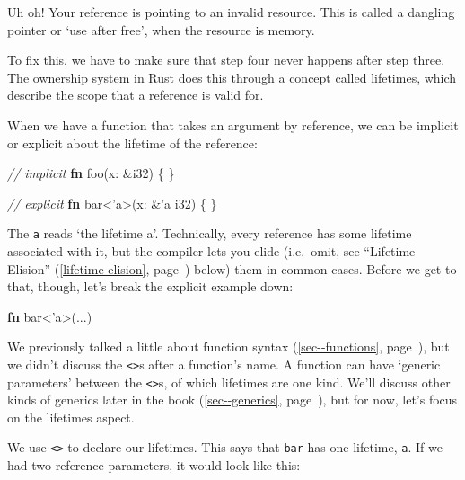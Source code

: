 \documentclass[a4paper,]{book}
\renewcommand*{\hyperlink}[2]{%
 #2 (\autoref{#1}, page~\pageref{#1})}
\newenvironment{Shaded}{\begin{snugshade}}{\end{snugshade}}
\newcommand{\KeywordTok}[1]{\textcolor[rgb]{0.13,0.29,0.53}{\textbf{{#1}}}}
\newcommand{\DataTypeTok}[1]{\textcolor[rgb]{0.13,0.29,0.53}{{#1}}}
\newcommand{\CommentTok}[1]{\textcolor[rgb]{0.56,0.35,0.01}{\textit{{#1}}}}
\newcommand{\OtherTok}[1]{\textcolor[rgb]{0.56,0.35,0.01}{{#1}}}
\newcommand{\NormalTok}[1]{{#1}}
\begin{document}
Uh oh! Your reference is pointing to an invalid resource. This is called
a dangling pointer or `use after free', when the resource is memory.

To fix this, we have to make sure that step four never happens after
step three. The ownership system in Rust does this through a concept
called lifetimes, which describe the scope that a reference is valid
for.

When we have a function that takes an argument by reference, we can be
implicit or explicit about the lifetime of the reference:

\begin{Shaded}
\begin{Highlighting}[]
\CommentTok{// implicit}
\KeywordTok{fn} \NormalTok{foo(x: &}\DataTypeTok{i32}\NormalTok{) \{}
\NormalTok{\}}

\CommentTok{// explicit}
\KeywordTok{fn} \NormalTok{bar<}\OtherTok{'a}\NormalTok{>(x: &}\OtherTok{'a} \DataTypeTok{i32}\NormalTok{) \{}
\NormalTok{\}}
\end{Highlighting}
\end{Shaded}

The \texttt{\textquotesingle{}a} reads `the lifetime a'. Technically,
every reference has some lifetime associated with it, but the compiler
lets you elide (i.e.~omit, see
\protect\hyperlink{lifetime-elision}{``Lifetime Elision''} below) them
in common cases. Before we get to that, though, let's break the explicit
example down:

\begin{Shaded}
\begin{Highlighting}[]
\KeywordTok{fn} \NormalTok{bar<}\OtherTok{'a}\NormalTok{>(...)}
\end{Highlighting}
\end{Shaded}

We previously talked a little about
\protect\hyperlink{sec--functions}{function syntax}, but we didn't
discuss the \texttt{\textless{}\textgreater{}}s after a function's name.
A function can have `generic parameters' between the
\texttt{\textless{}\textgreater{}}s, of which lifetimes are one kind.
We'll discuss other kinds of generics
\protect\hyperlink{sec--generics}{later in the book}, but for now, let's
focus on the lifetimes aspect.

We use \texttt{\textless{}\textgreater{}} to declare our lifetimes. This
says that \texttt{bar} has one lifetime, \texttt{\textquotesingle{}a}.
If we had two reference parameters, it would look like this:
\end{document}
